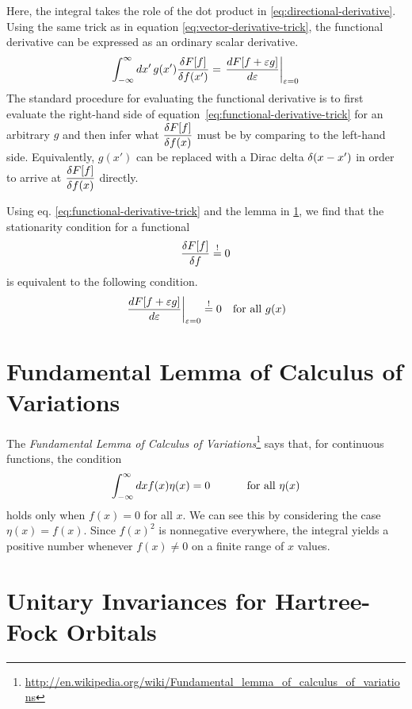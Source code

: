 \documentclass[11pt]{article}
\numberwithin{equation}{section}
\begin{document}
Here, the integral takes the role of the dot product in \ref{eq:directional-derivative}.
Using the same trick as in equation \ref{eq:vector-derivative-trick}, the functional derivative can be expressed as an ordinary scalar derivative.
\begin{align}
\label{eq:functional-derivative-trick}
  \int_{-\infty}^{\infty}
  dx'\,
  g(x')
  \fr{\d F[f]}{\d f(x')}
=
  \left.
  \fd{F[f+\e g]}{\e}
  \right|_{\e=0}
\end{align}
The standard procedure for evaluating the functional derivative is to first evaluate the right-hand side of equation~\ref{eq:functional-derivative-trick} for an arbitrary $g$ and then infer what $\dfr{\d F[f]}{\d f(x)}$ must be by comparing to the left-hand side.
Equivalently, $g(x')$ can be replaced with a Dirac delta $\d(x-x')$ in order to arrive at $\dfr{\d F[f]}{\d f(x)}$ directly.

Using eq. \ref{eq:functional-derivative-trick} and the lemma in \cref{app:fundamental-lemma-of-calculus-of-variations}, we find that the stationarity condition for a functional
\begin{align}
  \fr{\d F[f]}{\d f}
\overset{!}{=}
  0
\end{align}
is equivalent to the following condition.
\begin{align}
  \left.
  \fd{F[f+\e g]}{\e}
  \right|_{\e=0}
\overset{!}{=}
  0
&&
  \text{for all $g(x)$}
\end{align}


\newpage
\section{Fundamental Lemma of Calculus of Variations}\label{app:fundamental-lemma-of-calculus-of-variations}
The \textit{Fundamental Lemma of Calculus of Variations}\footnote{\url{http://en.wikipedia.org/wiki/Fundamental_lemma_of_calculus_of_variations}} says that, for continuous functions, the condition
\begin{align}
  \int_{-\infty}^\infty dx f(x)\eta(x)
=
  0
\sp\text{ for all $\eta(x)$}
\end{align}
holds only when $f(x)=0$ for all $x$.
We can see this by considering the case $\eta(x)=f(x)$.
Since $f(x)^2$ is nonnegative everywhere, the integral yields a positive number whenever $f(x)\neq 0$ on a finite range of $x$ values.



\newpage
\section{Unitary Invariances for Hartree-Fock Orbitals}\label{app:hartree-fock-orbital-invariance}
\end{document}
